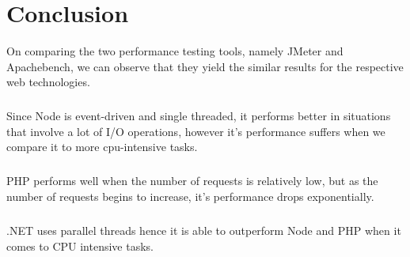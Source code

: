 \documentclass[../thesis.tex]{subfiles}
\begin{document}
\chapter{Conclusion}
On comparing the two performance testing tools, namely JMeter and Apachebench, we can observe that they yield the similar results for the respective web technologies.
\paragraph{}
Since Node is event-driven and single threaded, it performs better in situations that involve a lot of I/O operations, however it's performance suffers when we compare it to more cpu-intensive tasks.
\paragraph{}
PHP performs well when the number of requests is relatively low, but as the number of requests begins to increase, it's performance drops exponentially.
\paragraph{}
.NET uses parallel threads hence it is able to outperform Node and PHP when it comes to CPU intensive tasks.
\end{document}
